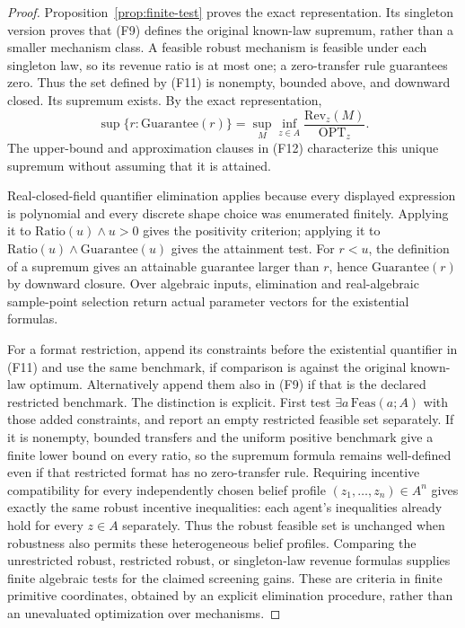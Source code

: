 \documentclass[11pt,a4paper]{article}
\begin{document}
\begin{proof}
Proposition~\ref{prop:finite-test} proves the exact representation.
Its singleton version proves that \textup{(F9)} defines the original
known-law supremum, rather than a smaller mechanism class. A feasible
robust mechanism is feasible under each singleton law, so its revenue
ratio is at most one; a zero-transfer rule guarantees zero. Thus the
set defined by \textup{(F11)} is nonempty, bounded above, and downward
closed. Its supremum exists. By the exact representation,
\[
 \sup\{r:\mathrm{Guarantee}(r)\}
 =\sup_M\inf_{z\in A}\frac{\mathrm{Rev}_z(M)}{\mathrm{OPT}_z}.
\]
The upper-bound and approximation clauses in \textup{(F12)} characterize
this unique supremum without assuming that it is attained.

Real-closed-field quantifier elimination applies because every displayed
expression is polynomial and every discrete shape choice was enumerated
finitely. Applying it to $\mathrm{Ratio}(u)\land u>0$ gives the positivity
criterion; applying it to
$\mathrm{Ratio}(u)\land\mathrm{Guarantee}(u)$ gives the attainment test.
For $r<u$, the definition of a supremum gives an attainable guarantee
larger than $r$, hence $\mathrm{Guarantee}(r)$ by downward closure.
Over algebraic inputs, elimination and real-algebraic sample-point
selection return actual parameter vectors for the existential formulas.

For a format restriction, append its constraints before the existential
quantifier in \textup{(F11)} and use the same benchmark, if comparison is
against the original known-law optimum. Alternatively append them also
in \textup{(F9)} if that is the declared restricted benchmark. The distinction
is explicit. First test $\exists a\,\mathrm{Feas}(a;A)$ with those added
constraints, and report an empty restricted feasible set separately.
If it is nonempty, bounded transfers and the uniform positive benchmark
give a finite lower bound on every ratio, so the supremum formula remains
well-defined even if that restricted format has no zero-transfer rule.
Requiring incentive compatibility for every independently chosen belief
profile $(z_1,\ldots,z_n)\in A^n$ gives exactly the same robust
incentive inequalities: each agent's inequalities already hold for every
$z\in A$ separately. Thus the robust feasible set is unchanged when
robustness also permits these heterogeneous belief profiles. Comparing the unrestricted robust, restricted robust, or
singleton-law revenue formulas supplies finite algebraic tests for the
claimed screening gains. These are criteria in finite primitive
coordinates, obtained by an explicit elimination procedure, rather than
an unevaluated optimization over mechanisms.
\end{proof}
\end{document}
